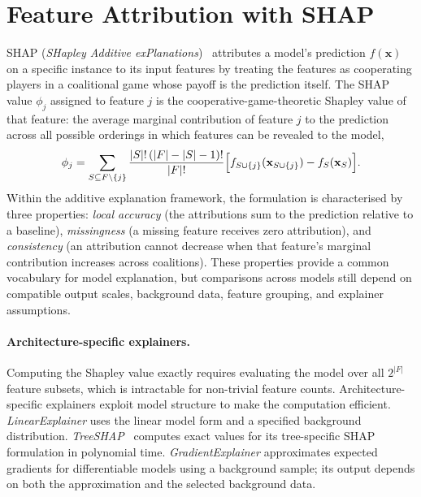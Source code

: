 \section{Feature Attribution with SHAP}
\label{sec:tb:shap}

SHAP (\emph{SHapley Additive exPlanations})~\cite{lundberg2017unified}
attributes a model's prediction $f(\mathbf{x})$ on a specific instance to its
input features by treating the features as cooperating players in a
coalitional game whose payoff is the prediction itself. The SHAP value
$\phi_{j}$ assigned to feature $j$ is the cooperative-game-theoretic Shapley
value of that feature: the average marginal contribution of feature $j$ to
the prediction across all possible orderings in which features can be
revealed to the model,
\[
\phi_{j} = \sum_{S \subseteq F\setminus\{j\}} \frac{|S|!\,(|F|-|S|-1)!}{|F|!}
           \Bigl[ f_{S\cup\{j\}}(\mathbf{x}_{S\cup\{j\}}) - f_{S}(\mathbf{x}_{S}) \Bigr].
\]
Within the additive explanation framework, the formulation is characterised by
three properties: \emph{local accuracy} (the attributions sum to the prediction
relative to a baseline), \emph{missingness} (a missing feature receives zero
attribution), and \emph{consistency} (an attribution cannot decrease when that
feature's marginal contribution increases across coalitions). These properties
provide a common vocabulary for model explanation, but comparisons across
models still depend on compatible output scales, background data, feature
grouping, and explainer assumptions.

\paragraph{Architecture-specific explainers.}
Computing the Shapley value exactly requires evaluating the model over all
$2^{|F|}$ feature subsets, which is intractable for non-trivial feature counts.
Architecture-specific explainers exploit model structure to make the
computation efficient. \emph{LinearExplainer} uses the linear model form and a
specified background distribution. \emph{TreeSHAP}~\cite{lundberg2020local}
computes exact values for its tree-specific SHAP formulation in polynomial
time. \emph{GradientExplainer} approximates expected gradients for
differentiable models using a background sample; its output depends on both
the approximation and the selected background data.

